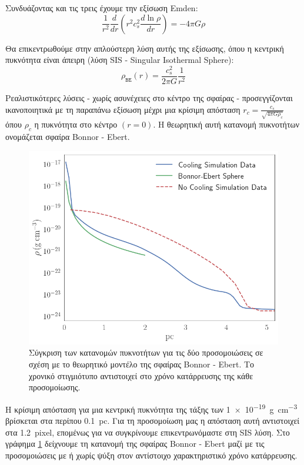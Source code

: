 	Συνδυάζοντας και τις τρεις έχουμε την εξίσωση Emden:
	\begin{equation}
	\frac{1}{r^2}\frac{d}{dr} \left( r^2 c_s ^2 \frac{d \ln \rho}{dr}\right)  = -4 \pi G \rho
	\end{equation}
	
	Θα επικεντρωθούμε στην απλούστερη λύση αυτής της εξίσωσης, όπου η κεντρική πυκνότητα είναι άπειρη (λύση SIS - Singular Isothermal Sphere):
	\begin{equation}
	\label{eq:B-E_density}
	\rho _\mathtt{BE}(r) =\frac{c_s ^2}{2 \pi G} \frac{1}{r^2}
	\end{equation}

 Ρεαλιστικότερες λύσεις - χωρίς ασυνέχειες στο κέντρο της σφαίρας - προσεγγίζονται ικανοποιητικά με τη παραπάνω εξίσωση μέχρι μια κρίσιμη απόσταση $r_c=\frac{c_s}{\sqrt{4\pi G \rho _c}}$ όπου $\rho _c$ η πυκνότητα στο κέντρο $(r=0)$.  Η θεωρητική αυτή κατανομή πυκνοτήτων ονομάζεται σφαίρα Bonnor - Ebert.
 
  \begin{figure}[h]
 	\centering
 	\includegraphics[width=1\linewidth]{DataImages/H2CoolGRHOprofile-BE}
 	\caption{Σύγκριση των κατανομών πυκνοτήτων για τις δύο προσομοιώσεις σε σχέση με το θεωρητικό μοντέλο της σφαίρας Bonnor - Ebert. Το χρονικό στιγμιότυπο αντιστοιχεί στο χρόνο κατάρρευσης της κάθε προσομοίωσης. }
 	\label{fig:h2coolgrhoprofile-be}
 \end{figure}
 
 
 Η κρίσιμη απόσταση για μια κεντρική πυκνότητα της τάξης των \SI{1e-19}{g.cm^{-3}} βρίσκεται στα περίπου \SI{0.1}{pc}. Για τη προσομοίωση μας η απόσταση αυτή αντιστοιχεί στα \SI{1.2}{pixel}, επομένως για να συγκρίνουμε επικεντρωνόμαστε στη SIS λύση. Στο γράφημα \ref{fig:h2coolgrhoprofile-be} δείχνουμε τη κατανομή της σφαίρας Bonnor - Ebert μαζί με τις προσομοιώσεις με ή χωρίς ψύξη στον αντίστοιχο χαρακτηριστικό χρόνο κατάρρευσης.  
 

